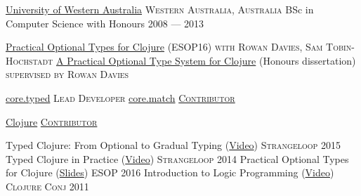 \documentclass[10pt,a4paper]{article}
\begin{document}
\headedsection
  {\href{http://www.uwa.edu.au}{University of Western Australia}}
  {\textsc{Western Australia, Australia}} {%
  \headedsubsection
    {BSc in Computer Science with Honours}
    {2008 --- 2013}
    {}
}

%
%
%

\headedsection
  {\href{http://frenchy64.github.io/papers/esop16-short.pdf}{Practical Optional Types for Clojure}
  (ESOP16)}
  {\textsc{with Rowan Davies, Sam Tobin-Hochstadt}} {%
    {}
}
\headedsection
  {\href{https://s3.amazonaws.com/github/downloads/frenchy64/papers/ambrose-honours.pdf}{A Practical Optional Type System for Clojure} (Honours dissertation)}
  {\textsc{supervised by Rowan Davies}} {%
    {}
}


%



\headedsection
  {\href{https://github.com/clojure/core.typed}{core.typed}}
  {\textsc{Lead Developer}} {%
    {
    }
}
\headedsection
  {\href{https://github.com/clojure/core.match}{core.match}}
  {\href{https://github.com/clojure/core.match/commits?author=frenchy64}{\textsc{Contributor}}} {%
    {%
    }
}

\headedsection
  {\href{https://github.com/clojure/clojure}{Clojure}}
  {\href{https://github.com/clojure/clojure/commits?author=frenchy64}{\textsc{Contributor}}} {%
    {%
    }
}


\headedsection
  {Typed Clojure: From Optional to Gradual Typing (\href{https://www.youtube.com/watch?v=yG9CffLlXx0}{Video})}
  {\textsc{Strangeloop 2015}} {%
}
\headedsection
  {Typed Clojure in Practice (\href{https://www.youtube.com/watch?v=a0gT0syAXsY}{Video})}
  {\textsc{Strangeloop 2014}} {%
}
\headedsection
  {Practical Optional Types for Clojure (\href{http://ambrosebs.com/talks/esop16.pdf}{Slides})}
  {\textsc{ESOP 2016}} {%
  }
\headedsection
  {Introduction to Logic Programming (\href{https://www.youtube.com/watch?v=irjP8BO1B8Y}{Video})}
  {\textsc{Clojure Conj 2011}} {%
}
\end{document}
